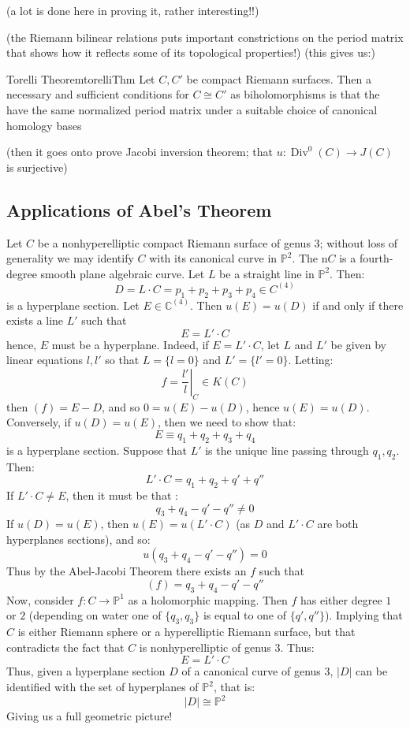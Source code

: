 \documentclass{book}
\newcommand{\C}{{\mathbb{C}}}
\renewcommand{\P}{{\mathbb{P}}}
\newcommand{\Div}{{\operatorname{Div}}}
\begin{document}
(a lot is done here in proving it, rather interesting!!)

(the Riemann bilinear relations puts important constrictions on the period matrix that shows how it reflects
some of its topological properties!) (this gives us:)

\begin{thm}{Torelli Theorem}{torelliThm}
  Let $C, C'$ be compact Riemann surfaces. Then a necessary and sufficient conditions for $C\cong C'$ as
  biholomorphisms is that the have the same normalized period matrix under a suitable choice of canonical
  homology bases
\end{thm}

\begin{Proof}
  \cite[p.174]{a.griffithsIntroductionAlgebraicCurves}
\end{Proof}

(then it goes onto prove Jacobi inversion theorem; that $u: \Div^0(C) \to J(C)$ is surjective)

\subsection{Applications of Abel's Theorem}\label{sec:abelThmApplication}

Let $C$ be a nonhyperelliptic compact Riemann surface of genus $3$; without loss of generality we may identify
$C$ with its canonical curve in $\P^2$. The n$C$ is a fourth-degree smooth plane algebraic curve. Let $L$ be
a straight line in $\P^2$. Then:
\[
  D = L\cdot C = p_1 + p_2 + p_3 + p_4 \in C^{(4)}
\]
is a hyperplane section. Let $E \in \C^{(4)}$. Then $u(E) = u(D)$ if and only if there exists a line $L'$ such that
\[
  E = L'\cdot C
\]
hence, $E$ must be a hyperplane. Indeed, if $E = L'\cdot C$, let $L$ and $L'$ be given by linear equations
$l,l'$ so that $L = \{l = 0\}$ and $L' = \{l' = 0\}$. Letting:
\[
  f = \left.\frac{l'}{l}\right|_{C} \in K(C)
\]
then $(f) = E-D$, and so $0 = u(E)-u(D)$, hence $u(E) = u(D)$. Conversely, if $u(D) = u(E)$, then we need to
show that:
\[
  E \equiv q_1 + q_2 + q_3 + q_4
\]
is a hyperplane section. Suppose that $L'$ is the unique line passing through $q_1, q_2$. Then:
\[
  L'\cdot C = q_1 + q_2 + q' + q''
\]
If $L'\cdot C \ne E$, then it must be that :
\[
  q_3 + q_4 - q' -q'' \ne 0
\]
If $u(D) = u(E)$, then $u(E) = u(L'\cdot C)$ (as $D$ and $L'\cdot C$ are both hyperplanes sections), and so:
\[
  u(q_3+q_4 - q'-q'') = 0
\]
Thus by the Abel-Jacobi Theorem there exists an $f$ such that
\[
  (f) = q_3 + q_4 -q'-q''
\]
Now, consider $f: C \to \P^1$ as a holomorphic mapping. Then $f$ has either degree $1$ or $2$ (depending on
water one of $\{q_3, q_3\}$ is equal to one of $\{q', q''\}$). Implying that $C$ is either Riemann sphere or
a hyperelliptic Riemann surface, but that contradicts the fact that $C$ is nonhyperelliptic of genus $3$.
Thus:
\[
  E = L'\cdot C
\]
Thus, given a hyperplane section $D$ of a canonical curve of genus $3$, $|D|$ can be identified with the set
of hyperplanes of $\P^2$, that is:
\[
  |D| \cong \P^2
\]
Giving us a full geometric picture!
\end{document}
